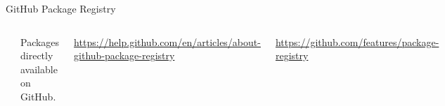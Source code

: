 \begin{frame}{GitHub Package Registry}

\begin{columns}

{\centering\includegraphics[width=6cm]{08_sharing/images/github_registry.png} \par }

Packages directly available on GitHub.


\url{https://help.github.com/en/articles/about-github-package-registry}


\url{https://github.com/features/package-registry}

\end{columns}

\end{frame}



